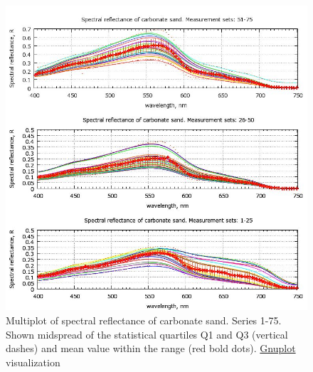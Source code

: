 \documentclass[10pt, a4paper]{article}
\begin{document}
\begin{figure}
	\begin{center}
		\includegraphics[scale=0.5]{GNU-16.jpg}
		\caption{Multiplot of spectral reflectance of carbonate sand. Series 1-75. Shown midspread of the statistical quartiles Q1 and Q3 (vertical dashes) and
			mean value within the range (red bold dots). \href{http://www.gnuplot.info/}{Gnuplot} visualization­}
		\label{fig:36}
	\end{center}
\end{figure}
\end{document}

